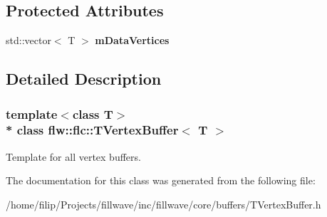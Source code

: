 \subsection*{Protected Attributes}
\begin{DoxyCompactItemize}
\item 
std\+::vector$<$ T $>$ {\bfseries m\+Data\+Vertices}\hypertarget{classflw_1_1flc_1_1TVertexBuffer_a659e673f6f1efe77a500a5a4819cdc16}{}\label{classflw_1_1flc_1_1TVertexBuffer_a659e673f6f1efe77a500a5a4819cdc16}

\end{DoxyCompactItemize}


\subsection{Detailed Description}
\subsubsection*{template$<$class T$>$\\*
class flw\+::flc\+::\+T\+Vertex\+Buffer$<$ T $>$}

Template for all vertex buffers. 

The documentation for this class was generated from the following file\+:\begin{DoxyCompactItemize}
\item 
/home/filip/\+Projects/fillwave/inc/fillwave/core/buffers/T\+Vertex\+Buffer.\+h\end{DoxyCompactItemize}
